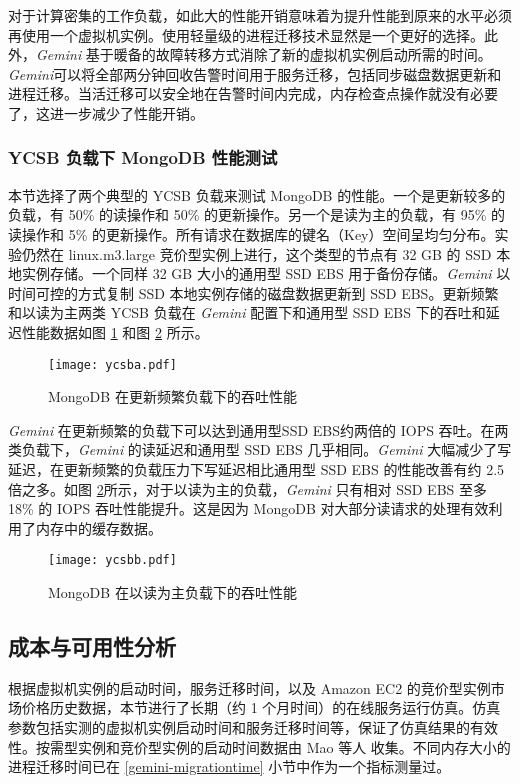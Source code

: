 对于计算密集的工作负载，如此大的性能开销意味着为提升性能到原来的水平必须再使用一个虚拟机实例。使用轻量级的进程迁移技术显然是一个更好的选择。此外，\emph{Gemini} 基于暖备的故障转移方式消除了新的虚拟机实例启动所需的时间。\emph{Gemini}可以将全部两分钟回收告警时间用于服务迁移，包括同步磁盘数据更新和进程迁移。当活迁移可以安全地在告警时间内完成，内存检查点操作就没有必要了，这进一步减少了性能开销。

\subsubsection{YCSB 负载下 MongoDB 性能测试}
本节选择了两个典型的 YCSB 负载来测试 MongoDB 的性能。一个是更新较多的负载，有 50\% 的读操作和 50\% 的更新操作。另一个是读为主的负载，有 95\% 的读操作和 5\% 的更新操作。所有请求在数据库的键名（Key）空间呈均匀分布。实验仍然在 linux.m3.large 竞价型实例上进行，这个类型的节点有 32 GB 的 SSD 本地实例存储。一个同样 32 GB 大小的通用型 SSD EBS 用于备份存储。\emph{Gemini} 以时间可控的方式复制 SSD 本地实例存储的磁盘数据更新到 SSD EBS。更新频繁和以读为主两类 YCSB 负载在 \emph{Gemini} 配置下和通用型 SSD EBS 下的吞吐和延迟性能数据如图 \ref{figure:ycsba} 和图 \ref{figure:ycsbb} 所示。
\begin{figure}[]
  \centering
  \texttt{[image: ycsba.pdf]}
  \caption{MongoDB 在更新频繁负载下的吞吐性能}
  \label{figure:ycsba}
\end{figure}

\emph{Gemini} 在更新频繁的负载下可以达到通用型SSD EBS约两倍的 IOPS 吞吐。在两类负载下，\emph{Gemini} 的读延迟和通用型 SSD EBS 几乎相同。\emph{Gemini} 大幅减少了写延迟，在更新频繁的负载压力下写延迟相比通用型 SSD EBS 的性能改善有约 2.5 倍之多。如图 \ref{figure:ycsbb}所示，对于以读为主的负载，\emph{Gemini} 只有相对 SSD EBS 至多 18\% 的 IOPS 吞吐性能提升。这是因为 MongoDB 对大部分读请求的处理有效利用了内存中的缓存数据。
\begin{figure}[]
  \centering
  \texttt{[image: ycsbb.pdf]}
  \caption{MongoDB 在以读为主负载下的吞吐性能}
  \label{figure:ycsbb}
\end{figure}

\subsection{成本与可用性分析}
根据虚拟机实例的启动时间，服务迁移时间，以及 Amazon EC2 的竞价型实例市场价格历史数据，本节进行了长期（约 1 个月时间）的在线服务运行仿真。仿真参数包括实测的虚拟机实例启动时间和服务迁移时间等，保证了仿真结果的有效性。按需型实例和竞价型实例的启动时间数据由 Mao 等人 \cite{Mao:2012:PSV:2353730.2353859} 收集。不同内存大小的进程迁移时间已在 \ref{gemini-migrationtime} 小节中作为一个指标测量过。

